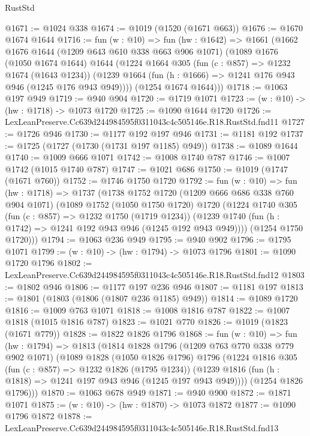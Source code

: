 \begin{lexlean}{RustStd}
\begin{coremodule}
@1671 := @1024 @338
@1674 := @1019 (@1520 (@1671 @663))
@1676 := @1670 @1674 @1644
@1716 := fun (w : @10) =>
  fun (hw : @1642) =>
  @1661
    (@1662
      @1676
      @1644
      (@1209 @643 @610 @338 @663 @906 @1071)
      (@1089
        @1676
        (@1050 @1674 @1644)
        @1644
        (@1224
          @1664
          @305
          (fun (c : @857) => @1232 @1674 (@1643 @1234))
          (@1239 @1664 (fun (h : @1666) => @1241 @176 @943 @946 (@1245 @176 @943 @949))))
        (@1254 @1674 @1644)))
@1718 := @1063 @197 @949
@1719 := @940 @904
@1720 := @1719 @1071
@1723 := (w : @10) -> (hw : @1718) -> @1073 @1720
@1725 := @1090 @1644 @1720
@1726 := LexLeanPreserve.Cc639d244984595f0311043c4c505146e.R18.RustStd.fnd11
@1727 := @1726 @946
@1730 := @1177 @192 @197 @946
@1731 := @1181 @192
@1737 := @1725 (@1727 (@1730 (@1731 @197 @1185) @949))
@1738 := @1089 @1644
@1740 := @1009 @666 @1071
@1742 := @1008 @1740 @787
@1746 := @1007 @1742 (@1015 @1740 @787)
@1747 := @1021 @686
@1750 := @1019 (@1747 (@1671 @760))
@1752 := @1746 @1750 @1720
@1792 := fun (w : @10) =>
  fun (hw : @1718) =>
  @1737
    (@1738
      @1752
      @1720
      (@1209 @666 @686 @338 @760 @904 @1071)
      (@1089
        @1752
        (@1050 @1750 @1720)
        @1720
        (@1224
          @1740
          @305
          (fun (c : @857) => @1232 @1750 (@1719 @1234))
          (@1239 @1740 (fun (h : @1742) => @1241 @192 @943 @946 (@1245 @192 @943 @949))))
        (@1254 @1750 @1720)))
@1794 := @1063 @236 @949
@1795 := @940 @902
@1796 := @1795 @1071
@1799 := (w : @10) -> (hw : @1794) -> @1073 @1796
@1801 := @1090 @1720 @1796
@1802 := LexLeanPreserve.Cc639d244984595f0311043c4c505146e.R18.RustStd.fnd12
@1803 := @1802 @946
@1806 := @1177 @197 @236 @946
@1807 := @1181 @197
@1813 := @1801 (@1803 (@1806 (@1807 @236 @1185) @949))
@1814 := @1089 @1720
@1816 := @1009 @763 @1071
@1818 := @1008 @1816 @787
@1822 := @1007 @1818 (@1015 @1816 @787)
@1823 := @1021 @770
@1826 := @1019 (@1823 (@1671 @779))
@1828 := @1822 @1826 @1796
@1868 := fun (w : @10) =>
  fun (hw : @1794) =>
  @1813
    (@1814
      @1828
      @1796
      (@1209 @763 @770 @338 @779 @902 @1071)
      (@1089
        @1828
        (@1050 @1826 @1796)
        @1796
        (@1224
          @1816
          @305
          (fun (c : @857) => @1232 @1826 (@1795 @1234))
          (@1239 @1816 (fun (h : @1818) => @1241 @197 @943 @946 (@1245 @197 @943 @949))))
        (@1254 @1826 @1796)))
@1870 := @1063 @678 @949
@1871 := @940 @900
@1872 := @1871 @1071
@1875 := (w : @10) -> (hw : @1870) -> @1073 @1872
@1877 := @1090 @1796 @1872
@1878 := LexLeanPreserve.Cc639d244984595f0311043c4c505146e.R18.RustStd.fnd13

\end{coremodule}
\end{lexlean}
